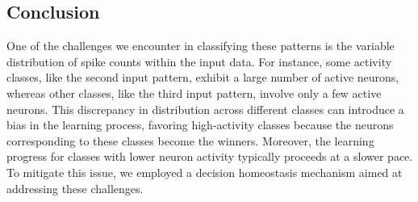 \documentclass[12pt]{article}
\begin{document}
\subsection{Conclusion}

One of the challenges we encounter in classifying these patterns is the variable distribution of spike counts within the input data. For instance, some activity classes, like the second input pattern, exhibit a large number of active neurons, whereas other classes, like the third input pattern, involve only a few active neurons. This discrepancy in distribution across different classes can introduce a bias in the learning process, favoring high-activity classes because the neurons corresponding to these classes become the winners. Moreover, the learning progress for classes with lower neuron activity typically proceeds at a slower pace. To mitigate this issue, we employed a decision homeostasis mechanism aimed at addressing these challenges.
\end{document}
